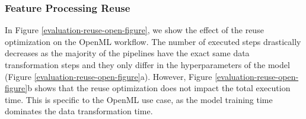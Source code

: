 \subsubsection{Feature Processing Reuse}  
In Figure \ref{evaluation-reuse-open-figure}, we show the effect of the reuse optimization on the OpenML workflow.
The number of executed steps drastically decreases as the majority of the pipelines have the exact same data transformation steps and they only differ in the hyperparameters of the model (Figure \ref{evaluation-reuse-open-figure}a).
However, Figure \ref{evaluation-reuse-open-figure}b shows that the reuse optimization does not impact the total execution time.
This is specific to the OpenML use case, as the model training time dominates the data transformation time.

